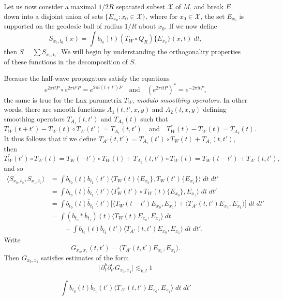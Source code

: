 Let us now consider a maximal $1/2R$ separated subset $\mathcal{X}$ of $M$, and break $E$ down into a disjoint union of sets $\{ E_{x_0}: x_0 \in \mathcal{X} \}$, where for $x_0 \in \mathcal{X}$, the set $E_{x_0}$ is supported on the geodesic ball of radius $1/R$ about $x_0$. If we now define
%
\[ S_{x_0,t_0}(x) = \int b_{t_0}(t) (T_W \circ Q_R) \{ E_{x_0} \}(x,t)\; dt, \]
%
then $S = \sum S_{x_0,t_0}$. We will begin by understanding the orthogonality properties of these functions in the decomposition of $S$.

Because the half-wave propagators satisfy the equations
%
\[ e^{2 \pi i t P} \circ e^{2 \pi i t' P} = e^{2 \pi i (t + t') P} \quad\text{and}\quad (e^{2 \pi i t P})^* = e^{-2 \pi i t P}, \]
%
the same is true for the Lax parametrix $T_W$, \emph{modulo smoothing operators}. In other words, there are smooth functions $A_1(t,t',x,y)$ and $A_2(t,x,y)$ defining smoothing operators $T_{A_1}(t,t')$ and $T_{A_2}(t)$ such that
%
\[ T_W(t+t') - T_W(t) \circ T_W(t') = T_{A_1}(t,t') \quad\text{and}\quad T_W^*(t) - T_W(t) = T_{A_2}(t). \]
%
It thus follows that if we define $T_{A'}(t,t') = T_{A_2}(t') \circ T_W(t) + T_{A_1}(t,t')$, then
%
\[ T_W^*(t') \circ T_W(t) = T_W(-t') \circ T_W(t) + T_{A_2}(t,t') \circ T_W(t) = T_W(t-t') + T_{A'}(t,t'), \]
%
and so
%
\begin{align*}
    \langle S_{x_0,t_0}, S_{x_1,t_1} \rangle &= \int b_{t_0}(t) \overline{b}_{t_1}(t') \Big\langle T_W(t) \{ E_{x_0} \}, T_W(t') \{ E_{x_1} \} \Big\rangle\; dt\; dt'\\
    &= \int b_{t_0}(t) \overline{b}_{t_1}(t') \langle T_W^*(t') \circ T_W(t) \{ E_{x_0} \}, E_{x_1} \rangle\; dt\; dt'\\
    &= \int b_{t_0}(t) \overline{b}_{t_1}(t') \Big[ \langle T_W(t-t') E_{x_0}, E_{x_1} \rangle + \langle T_{A'}(t,t') E_{x_0}, E_{x_1} \rangle \Big]\; dt\; dt'\\
    &= \int (b_{t_0} * \overline{b}_{t_1})(t) \langle T_W(t) E_{x_0}, E_{x_1} \rangle\; dt\\
    &\quad\quad+ \int b_{t_0}(t) \overline{b}_{t_1}(t') \langle T_{A'}(t,t') E_{x_0}, E_{x_1} \rangle\; dt\; dt'.
\end{align*}
%
Write
%
\[ G_{x_0,x_1}(t,t') = \langle T_{A'}(t,t') E_{x_0}, E_{x_1} \rangle. \]
%
Then $G_{x_0,x_1}$ satisfies estimates of the form
%
\[ \Big| \partial_t^k \partial_{t'}^l G_{x_0,x_1} \Big| \lesssim_{k,l} 1 \]


\[ \int b_{t_0}(t) \overline{b}_{t_1}(t') \langle T_{A'}(t,t') E_{x_0}, E_{x_1} \rangle\; dt\; dt' \]


